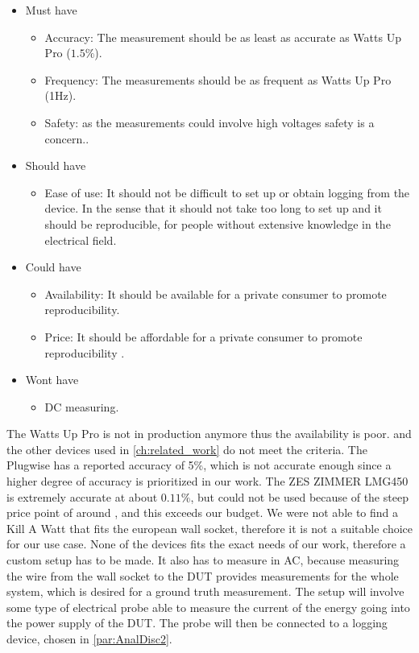 \begin{itemize}
    \item Must have
    \begin{itemize}
        \item Accuracy: The measurement should be as least as accurate as Watts Up Pro ($1.5\%$)\cite{fahad2019comparative}.
        \item Frequency: The measurements should be as frequent as Watts Up Pro (1Hz)\cite{fahad2019comparative}.
        \item Safety: as the measurements could involve high voltages safety is a concern.\cite{sik}.
    \end{itemize}
    \item Should have
    \begin{itemize}
        \item Ease of use: It should not be difficult to set up or obtain logging from the device. In the sense that it should not take too long to set up and it should be reproducible, for people without extensive knowledge in the electrical field.
    \end{itemize}
    \item Could have
    \begin{itemize}
        \item Availability: It should be available for a private consumer to promote reproducibility.
        \item Price: It should be affordable for a private consumer to promote reproducibility .
    \end{itemize}
    \item Wont have
    \begin{itemize}
        \item DC measuring.
    \end{itemize}
\end{itemize}
The Watts Up Pro is not in production anymore thus the availability is poor. and the other devices used in \cref{ch:related_work} do not meet the criteria. The Plugwise has a reported accuracy of 5\%\cite{PlugWise}, which is not accurate enough since a higher degree of accuracy is prioritized in our work. The ZES ZIMMER LMG450 is extremely accurate at about $0.11\%$\cite{hackenberg2013}, but could not be used because of the steep price point of around , and this exceeds our budget. We were not able to find a Kill A Watt\cite{KillAWatt} that fits the european wall socket, therefore it is not a suitable choice for our use case. None of the devices fits the exact needs of our work, therefore a custom setup has to be made. It also has to measure in AC, because measuring the wire from the wall socket to the DUT provides measurements for the whole system, which is desired for a ground truth measurement. The setup will involve some type of electrical probe able to measure the current of the energy going into the power supply of the DUT. The probe will then be connected to a logging device, chosen in \cref{par:AnalDisc2}. 


